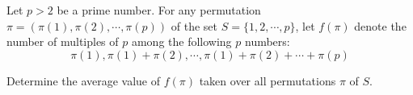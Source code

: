 Let $ p>2 $ be a prime number. For any permutation $ \pi = ( \pi(1) , \pi(2) , \cdots , \pi(p) ) $ of the set $ S = \{ 1, 2, \cdots , p \} $,  let $ f( \pi ) $ denote the number of multiples of $ p $ among the following $ p $ numbers:\[ \pi(1) , \pi(1) + \pi(2) , \cdots , \pi(1) + \pi(2) + \cdots + \pi(p)  \]

Determine the average value of $ f( \pi) $ taken over all permutations $ \pi $ of $ S $.